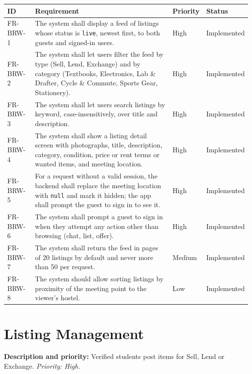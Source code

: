 \documentclass[11pt,a4paper]{scrreprt}
\newenvironment{reqtable}{%
  \small
  \begin{longtable}{>{\raggedright\arraybackslash\ttfamily\footnotesize}p{2.05cm} L{8.85cm} L{1.45cm} L{2.05cm}}
  \toprule
  \normalfont\normalsize\textbf{ID} & \textbf{Requirement} & \textbf{Priority} & \textbf{Status}\\
  \midrule\endhead
  \bottomrule\endfoot
}{\end{longtable}}
\newcommand{\impl}{Implemented}
\begin{document}
\begin{reqtable}
FR-BRW-1 & The system shall display a feed of listings whose status is \texttt{live}, newest first, to both guests and signed-in users. & High & \impl\\
FR-BRW-2 & The system shall let users filter the feed by type (Sell, Lend, Exchange) and by category (Textbooks, Electronics, Lab \& Drafter, Cycle \& Commute, Sports Gear, Stationery). & High & \impl\\
FR-BRW-3 & The system shall let users search listings by keyword, case-insensitively, over title and description. & High & \impl\\
FR-BRW-4 & The system shall show a listing detail screen with photographs, title, description, category, condition, price or rent terms or wanted items, and meeting location. & High & \impl\\
FR-BRW-5 & For a request without a valid session, the backend shall replace the meeting location with \texttt{null} and mark it hidden; the app shall prompt the guest to sign in to see it. & High & \impl\\
FR-BRW-6 & The system shall prompt a guest to sign in when they attempt any action other than browsing (chat, list, offer). & High & \impl\\
FR-BRW-7 & The system shall return the feed in pages of 20 listings by default and never more than 50 per request. & Medium & \impl\\
FR-BRW-8 & The system should allow sorting listings by proximity of the meeting point to the viewer's hostel. & Low & \impl\\
\end{reqtable}

\section{Listing Management}
\textbf{Description and priority:} Verified students post items for Sell,
Lend or Exchange. \emph{Priority: High.}
\end{document}
